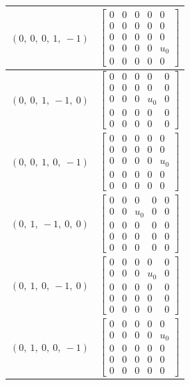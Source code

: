 \documentclass[11pt]{article}
\theoremstyle{definition}
\begin{document}
\begin{tabular}{|l|c|}
    \hline
    $\left( 0, \  0, \  0, \  1, \  -1\right)$ & $\left[\begin{matrix}0 & 0 & 0 & 0 & 0\\0 & 0 & 0 & 0 & 0\\0 & 0 & 0 & 0 & 0\\0 & 0 & 0 & 0 & u_{0}\\0 & 0 & 0 & 0 & 0\end{matrix}\right]$ \\
    \hline
    $\left( 0, \  0, \  1, \  -1, \  0\right)$ & $\left[\begin{matrix}0 & 0 & 0 & 0 & 0\\0 & 0 & 0 & 0 & 0\\0 & 0 & 0 & u_{0} & 0\\0 & 0 & 0 & 0 & 0\\0 & 0 & 0 & 0 & 0\end{matrix}\right]$ \\
    \hline
    $\left( 0, \  0, \  1, \  0, \  -1\right)$ & $\left[\begin{matrix}0 & 0 & 0 & 0 & 0\\0 & 0 & 0 & 0 & 0\\0 & 0 & 0 & 0 & u_{0}\\0 & 0 & 0 & 0 & 0\\0 & 0 & 0 & 0 & 0\end{matrix}\right]$ \\
    \hline
    $\left( 0, \  1, \  -1, \  0, \  0\right)$ & $\left[\begin{matrix}0 & 0 & 0 & 0 & 0\\0 & 0 & u_{0} & 0 & 0\\0 & 0 & 0 & 0 & 0\\0 & 0 & 0 & 0 & 0\\0 & 0 & 0 & 0 & 0\end{matrix}\right]$ \\
    \hline
    $\left( 0, \  1, \  0, \  -1, \  0\right)$ & $\left[\begin{matrix}0 & 0 & 0 & 0 & 0\\0 & 0 & 0 & u_{0} & 0\\0 & 0 & 0 & 0 & 0\\0 & 0 & 0 & 0 & 0\\0 & 0 & 0 & 0 & 0\end{matrix}\right]$ \\
    \hline
    $\left( 0, \  1, \  0, \  0, \  -1\right)$ & $\left[\begin{matrix}0 & 0 & 0 & 0 & 0\\0 & 0 & 0 & 0 & u_{0}\\0 & 0 & 0 & 0 & 0\\0 & 0 & 0 & 0 & 0\\0 & 0 & 0 & 0 & 0\end{matrix}\right]$ \\

\end{tabular}
\end{document}
